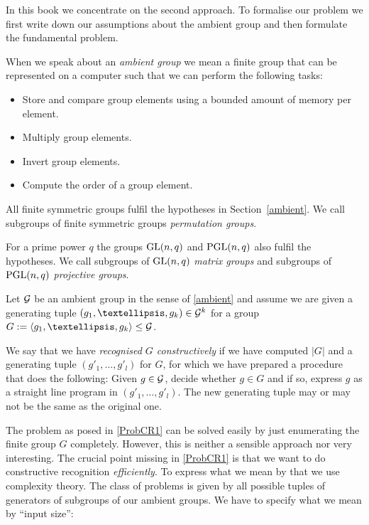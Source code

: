 In this book we concentrate on the second approach. To formalise our
problem we first write down our assumptions about the ambient group
and then formulate the fundamental problem.

\begin{Hyp}
\label{ambient}
When we speak about an \emph{ambient group} we mean a finite group that can
be represented on a computer such that we can perform the following tasks:
\begin{itemize}
\item Store and compare group elements using a bounded amount of memory
per element.
\item Multiply group elements.
\item Invert group elements.
\item Compute the order of a group element.
\end{itemize}
\end{Hyp}

\begin{Rem}
All finite symmetric groups fulfil the hypotheses in Section~\ref{ambient}.
We call subgroups of finite symmetric groups \emph{permutation groups}.

For a prime power $q$ the groups $\GL(n,q)$ and $\PGL(n,q)$ also fulfil
the hypotheses. We call subgroups of $\GL(n,q)$ \emph{matrix groups}
and subgroups of $\PGL(n,q)$ \emph{projective groups}.
\end{Rem}

\begin{Problem}
\label{ProbCR1}
Let $\mathcal{G}$ be an ambient group in the sense of \ref{ambient} and 
assume we are given a generating tuple $(g_1, \ldots, g_k) \in
\GG^k$ for a group
$G := \left< g_1, \ldots, g_k \right> \le \GG$. 

We say that we have \emph{recognised $G$ constructively} if we have 
computed $|G|$ and a
generating tuple $( g'_1, \ldots, g'_l )$ for $G$, for which we have
prepared a procedure that does the following: Given $g \in \mathcal{G}$,
decide whether $g \in G$ and if so, express $g$ as a straight line program
in $(g'_1, \ldots, g'_l)$. The new generating tuple may or may not be the
same as the original one.
\proofend
\end{Problem}

The problem as posed in \ref{ProbCR1} can be solved easily by just
enumerating the finite group $G$ completely. However, this is neither
a sensible approach nor very interesting. The crucial point missing
in \ref{ProbCR1} is that we want to do constructive recognition
\emph{efficiently}. To express what we mean by that we use complexity
theory. The class of problems is given by all possible tuples of
generators of subgroups of our ambient groups. We have to specify
what we mean by ``input size'':

